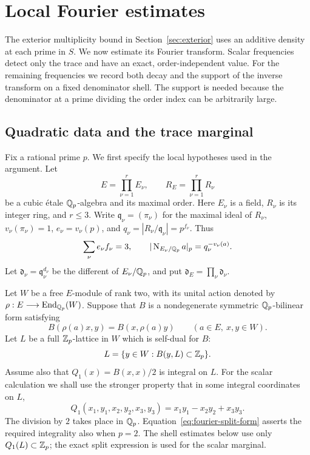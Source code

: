 \section{Local Fourier estimates}\label{sec:local-fourier}

The exterior multiplicity bound in Section~\ref{sec:exterior} uses an
additive density at each prime in $S$.  We now estimate its Fourier transform.
Scalar frequencies detect only the trace and have an exact, order-independent
value.  For the remaining frequencies we record both decay and the support of
the inverse transform on a fixed denominator shell.  The support is needed
because the denominator at a prime dividing the order index can be arbitrarily
large.

\subsection{Quadratic data and the trace marginal}

Fix a rational prime $p$.  We first specify the local hypotheses used in the
argument.  Let
\[
 E=\prod_{\nu=1}^r E_\nu,\qquad R_E=\prod_{\nu=1}^r R_\nu
\]
be a cubic \'etale $\mathbb Q_p$-algebra and its maximal order.  Here $E_\nu$ is a
field, $R_\nu$ is its integer ring, and $r\le3$.  Write
$\mathfrak q_\nu=(\pi_\nu)$ for the maximal ideal of $R_\nu$,
$v_\nu(\pi_\nu)=1$, $e_\nu=v_\nu(p)$, and
$q_\nu=|R_\nu/\mathfrak q_\nu|=p^{f_\nu}$.  Thus
\[
 \sum_\nu e_\nu f_\nu=3,
 \qquad |\operatorname{N}_{E_\nu/\mathbb Q_p}a|_p=q_\nu^{-v_\nu(a)}.
\]
Let $\mathfrak d_\nu=\mathfrak q_\nu^{d_\nu}$ be the different of
$E_\nu/\mathbb Q_p$, and put $\mathfrak d_E=\prod_\nu\mathfrak d_\nu$.

Let $W$ be a free $E$-module of rank two, with its unital action denoted by
$\rho:E\longrightarrow\operatorname{End}_{\mathbb Q_p}(W)$.  Suppose that $B$ is a nondegenerate
symmetric $\mathbb Q_p$-bilinear form satisfying
\[
 B(\rho(a)x,y)=B(x,\rho(a)y)\qquad(a\in E,\ x,y\in W).
\]
Let $L$ be a full $\mathbb Z_p$-lattice in $W$ which is self-dual for $B$:
\[
 L=\{y\in W:B(y,L)\subset\mathbb Z_p\}.
\]
Assume also that $Q_1(x)=B(x,x)/2$ is integral on $L$.  For the scalar
calculation we shall use the stronger property that in some integral
coordinates on $L$,
\begin{equation}\label{eq:fourier-split-form}
 Q_1(x_1,y_1,x_2,y_2,x_3,y_3)
       =x_1y_1-x_2y_2+x_3y_3.
\end{equation}
The division by $2$ takes place in $\mathbb Q_p$.  Equation~\eqref{eq:fourier-split-form}
asserts the required integrality also when $p=2$.  The shell estimates below
use only $Q_1(L)\subset\mathbb Z_p$; the exact split expression is used for the
scalar marginal.

